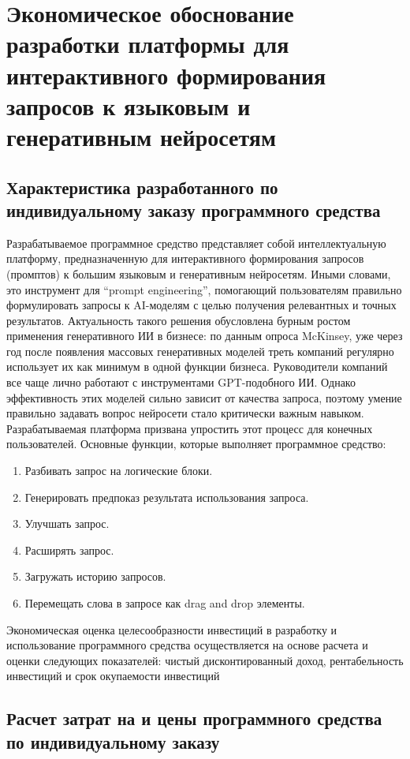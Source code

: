 \section{Экономическое обоснование разработки платформы для интерактивного формирования запросов к языковым и генеративным нейросетям}
\label{sec:economics}

\subsection{Характеристика разработанного по индивидуальному заказу  программного средства}
Разрабатываемое программное средство представляет собой интеллектуальную платформу, предназначенную для интерактивного формирования запросов (промптов) к большим языковым и генеративным нейросетям. Иными словами, это инструмент для “prompt engineering”, помогающий пользователям правильно формулировать запросы к AI-моделям с целью получения релевантных и точных результатов.
Актуальность такого решения обусловлена бурным ростом применения генеративного ИИ в бизнесе: по данным опроса McKinsey, уже через год после появления массовых генеративных моделей треть компаний регулярно использует их как минимум в одной функции бизнеса​.
Руководители компаний все чаще лично работают с инструментами GPT-подобного ИИ​.
Однако эффективность этих моделей сильно зависит от качества запроса, поэтому умение правильно задавать вопрос нейросети стало критически важным навыком​.
Разрабатываемая платформа призвана упростить этот процесс для конечных пользователей.
Основные функции, которые выполняет программное средство:
\begin{enumerate}[label=\arabic*.]
	\item Разбивать запрос на логические блоки.
	\item Генерировать предпоказ результата использования запроса.
	\item Улучшать запрос.
	\item Расширять запрос.
	\item Загружать историю запросов.
	\item Перемещать слова в запросе как drag and drop элементы.
\end{enumerate}
Экономическая оценка целесообразности инвестиций в разработку и использование программного средства осуществляется на основе расчета и оценки следующих показателей: чистый дисконтированный доход, рентабельность инвестиций и срок окупаемости инвестиций

\subsection{Расчет затрат на 	 и цены программного средства по индивидуальному заказу}

